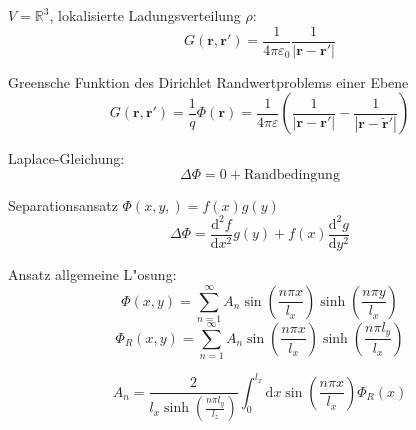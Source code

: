 \documentclass[titlepage,11pt,a4paper,ngerman]{report}
\newcommand{\dd}{\mathrm{d}}
\renewcommand{\vec}[1]{\bm{#1}}
\newcommand{\vepsilon}{\varepsilon}
\begin{document}
$V=\mathbb{R}^3$, lokalisierte Ladungsverteilung $\rho$:
\[G(\vec{r},\vec{r}')=\frac{1}{4\pi\vepsilon_0}\frac{1}{|\vec{r}-\vec{r}'|}\]

Greensche Funktion des Dirichlet Randwertproblems einer Ebene
\[G(\vec{r},\vec{r}')=\frac{1}{q}\Phi(\vec{r})=\frac{1}{4\pi\vepsilon}\left(\frac{1}{|\vec{r}-\vec{r}'|}-\frac{1}{|\vec{r}-\tilde{\vec{r}}'|}\right)\]

Laplace-Gleichung: \[\Delta\Phi=0+\mathrm{Randbedingung}\]

Separationsansatz $\Phi(x,y,)=f(x)g(y)$
\[\Delta\Phi=\frac{\dd^2f}{\dd x^2}g(y)+f(x)\frac{\dd^2g}{\dd y^2}\]

Ansatz allgemeine L"osung:
\[\Phi(x,y)=\sum_{n=1}^\infty A_n\sin\left(\frac{n\pi x}{l_x}\right)\sinh\left(\frac{n\pi y}{l_x}\right)\]
\[\Phi_R(x,y)=\sum_{n=1}^\infty A_n\sin\left(\frac{n\pi x}{l_x}\right)\sinh\left(\frac{n\pi l_y}{l_x}\right)\]

\[A_n=\frac{2}{l_x\sinh\left(\frac{n\pi l_y}{l_z}\right)}\int_0^{l_x}\dd x\sin\left(\frac{n\pi x}{l_x}\right)\Phi_R(x)\]


\end{document}
